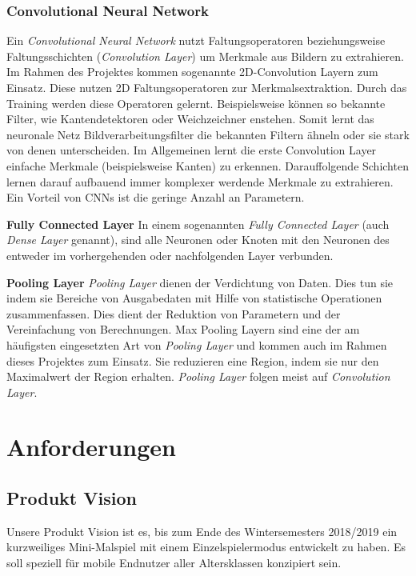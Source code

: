 \documentclass[11pt]{article}
\begin{document}
\subsubsection{Convolutional Neural Network}
Ein \textit{Convolutional Neural Network} nutzt Faltungsoperatoren beziehungsweise Faltungsschichten (\textit{Convolution Layer}) um Merkmale aus Bildern zu extrahieren. Im Rahmen des Projektes kommen sogenannte 2D-Convolution Layern zum Einsatz. Diese nutzen 2D Faltungsoperatoren zur Merkmalsextraktion. Durch das Training werden diese Operatoren gelernt. Beispielsweise können so bekannte Filter, wie Kantendetektoren oder Weichzeichner enstehen. Somit lernt das neuronale Netz Bildverarbeitungsfilter die bekannten Filtern ähneln oder sie stark von denen unterscheiden. Im Allgemeinen lernt die erste Convolution Layer einfache Merkmale (beispielsweise Kanten) zu erkennen. Darauffolgende Schichten lernen darauf aufbauend immer komplexer werdende Merkmale zu extrahieren. Ein Vorteil von CNNs ist die geringe Anzahl an Parametern.\parencite{Pattanayak2017}

\textbf{Fully Connected Layer}\newline
In einem sogenannten \textit{Fully Connected Layer} (auch \textit{Dense Layer} genannt), sind alle Neuronen oder Knoten mit den Neuronen des entweder im vorhergehenden oder nachfolgenden Layer verbunden.\parencite{Pattanayak2017}

\textbf{Pooling Layer}\newline
\textit{Pooling Layer} dienen der Verdichtung von Daten. Dies tun sie indem sie Bereiche von Ausgabedaten mit Hilfe von statistische Operationen zusammenfassen. Dies dient der Reduktion von Parametern und der Vereinfachung von Berechnungen.  Max Pooling Layern sind eine der am häufigsten eingesetzten Art von \textit{Pooling Layer} und kommen auch im Rahmen dieses Projektes zum Einsatz. Sie reduzieren eine Region, indem sie nur den Maximalwert der Region erhalten. \textit{Pooling Layer} folgen meist auf \textit{Convolution Layer}.\parencite{Karpathy}\parencite{IanGoodfellowYoshuaBengio2016}


\section{Anforderungen}
\label{chap: Anforderungen}
\subsection{Produkt Vision}
\label{chap: productVision}
Unsere Produkt Vision ist es, bis zum Ende des Wintersemesters 2018/2019 ein kurzweiliges Mini-Malspiel mit einem Einzelspielermodus entwickelt zu haben. Es soll speziell für mobile Endnutzer aller Altersklassen konzipiert sein.
\end{document}
